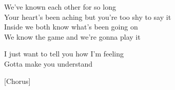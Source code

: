 \newpage
We've known each other for so long\\
Your heart's been aching but you're too shy to say it\\
Inside we both know what's been going on\\
We know the game and we're gonna play it\par
\vspace{10pt}
I just want to tell you how I'm feeling\\
Gotta make you understand\par
\vspace{10pt}
[Chorus]%
